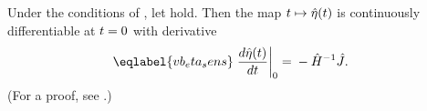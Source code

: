 \begin{thm}
%
Under the conditions of , let
 hold.   Then the map $t \mapsto
\hat\eta(t)$ is continuously differentiable at $t=0$ with derivative
%
\begin{align}\eqlabel{vb_eta_sens}
%
\fracat{d \etaopt(\t)}{d \t}{0} ={}&
    - \hessopt^{-1} \crosshessian.
%
\end{align}
%
(For a proof, see  .)
%
\end{thm}
